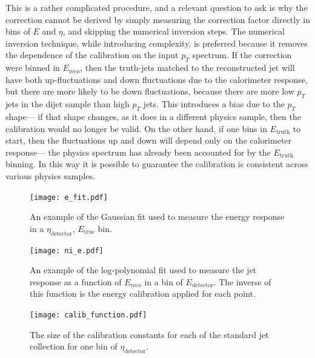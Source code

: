 This is a rather complicated procedure, and a relevant question to ask is why the correction cannot be derived by simply measuring the correction factor directly in bins of $E$ and $\eta$, and skipping the numerical inversion steps. The numerical inversion technique, while introducing complexity, is preferred because it removes the dependence of the calibration on the input $p_T$ spectrum. If the correction were binned in $E_{\mathrm{reco}}$, then the truth-jets matched to the reconstructed jet will have both up-fluctuations and down fluctuations due to the calorimeter response, but there are more likely to be down fluctuations, because there are more low $p_T$ jets in the dijet sample than high $p_T$ jets. This introduces a bias due to the $p_T$ shape--- if that shape changes, as it does in a different physics sample, then the calibration would no longer be valid. On the other hand, if one bins in $E_{\mathrm{truth}}$ to start, then the fluctuations up and down will depend only on the calorimeter response--- the physics spectrum has already been accounted for by the $E_{\mathrm{truth}}$ binning. In this way it is possible to guarantee the calibration is consistent across various physics samples.



\begin{figure}
\centering
\texttt{[image: e\_fit.pdf]}
\caption{An example of the Gaussian fit used to measure the energy response in a $\eta_\mathrm{detector}$, $E_\mathrm{true}$ bin.}
\label{fig:jet-reconstruction:e-fit}
\end{figure}




\begin{figure}
\centering
\texttt{[image: ni\_e.pdf]}
\caption{An example of the log-polynomial fit used to measure the jet response as a function of $E_\mathrm{reco}$ in a bin of $E_\mathrm{detector}$. The inverse of this function is the energy calibration applied for each point.}
\label{fig:jet-reconstruction:ni-e}
\end{figure}



\begin{figure}
\centering
\texttt{[image: calib\_function.pdf]}
\caption{The size of the calibration constants for each of the standard jet collection for one bin of $\eta_\mathrm{detector}$.}
\label{fig:jet-reconstruction:calib-function}
\end{figure}

